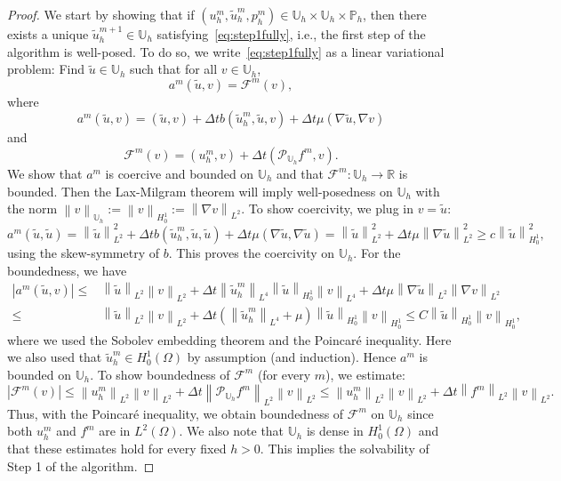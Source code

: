 \documentclass[10pt,letterpaper]{amsart}
\newcommand{\R}{\mathbb{R}}
\newcommand{\tu}{\widetilde{u}}
\newcommand\norm[1]{\left\lVert#1\right\rVert}
\newcommand{\Grad}{\nabla}
\newcommand{\dom}{\Omega}
\newcommand{\Ph}{\mathbb{P}_h}
\newcommand{\Uh}{\mathbb{U}_h}
\newcommand{\PUh}{\mathcal{P}_{\Uh}}
\theoremstyle{definition}{\newtheorem{definition}[lemma]{Definition}}
\numberwithin{equation}{section}
\begin{document}
\begin{proof}
	We start by showing that if $(u_h^m,\tu_h^m,p^m_h)\in\Uh\times\Uh\times\Ph$, then there exists a unique $\tu^{m+1}_h\in \Uh$ satisfying~\eqref{eq:step1fully}, i.e., the first step of the algorithm is well-posed. To do so, we write~\eqref{eq:step1fully} as a linear variational problem: Find $\tu\in \Uh $ such that for all $v\in \Uh $,
	\begin{equation}
	\label{eq:elliptic}
	a^m( \tu ,v)= \mathcal{F}^m(v),
	\end{equation}
	where 
	\begin{equation}
	\label{eq:defa}
	a^m(\tu,v) =  	\left(\tu,v\right)+ \Delta t b(\tu^m_h,\tu ,v)+\Delta t\mu(\Grad \tu ,\Grad v) 
	\end{equation}
and
	\begin{equation}
	\label{eq:deffn}
	\mathcal{F}^m(v) = (u^m_h,v)+\Delta t(\PUh f^{m},v).
		\end{equation}
We show that $a^m$ is coercive and bounded on $\Uh$ and that $\mathcal{F}^m:\Uh\to \R$ is bounded. Then the Lax-Milgram theorem will imply well-posedness on $\Uh$ with the norm $\norm{v}_{\Uh}:=\norm{v}_{H^1_0}:= \norm{\Grad v}_{L^2}$.	To show coercivity, we plug in $v=\tu$:
	\begin{equation*}
		a^m(\tu,\tu) =  	\norm{\tu}_{L^2}^2+ \Delta t b(\tu^m_h,\tu ,\tu)+\Delta t\mu(\Grad \tu ,\Grad \tu)
= \norm{\tu}_{L^2}^2+ \Delta t\mu\norm{\Grad \tu}_{L^2}^2
 \geq c\norm{\tu}_{H^1_0}^2,
	\end{equation*}
	using the skew-symmetry of $b$. 
 This proves the coercivity on $\Uh$. For the boundedness, we have
	\begin{align*}
	\left| 	a^m(\tu,v)\right| \leq  &  	\norm{\tu}_{L^2}\norm{v}_{L^2}+ \Delta t \norm{\tu^m_h}_{L^4}\norm{\tu}_{H^1_0}\norm{v}_{L^4}+\Delta t\mu\norm{\Grad \tu}_{L^2}\norm{\Grad v}_{L^2}\\
\leq & \norm{\tu}_{L^2}\norm{v}_{L^2}+ \Delta t( \norm{\tu^m_h}_{L^4}+\mu)\norm{\tu}_{H^1_0}\norm{v}_{H^1_0}\leq C \norm{\tu}_{H^1_0}\norm{v}_{H^1_0}, 
	\end{align*}
	where we used the Sobolev embedding theorem and the Poincar\'e inequality. Here we also used that $\tu^m_h\in H^1_0(\dom)$ by assumption (and induction).
	 Hence $a^m$ is bounded on $\Uh$. 
	To show boundedness of $\mathcal{F}^m$ (for every $m$), we estimate:
	\begin{equation*}
	|\mathcal{F}^m(v)|\leq \norm{u^m_h}_{L^2}\norm{v}_{L^2}+\Delta t \norm{\PUh f^{m}}_{L^2}\norm{v}_{L^2}\leq \norm{u^m_h}_{L^2}\norm{v}_{L^2}+ \Delta t\norm{  f^{m}}_{L^2}\norm{v}_{L^2}.
	\end{equation*}
	 Thus, with the Poincar\'e inequality, we obtain boundedness of $\mathcal{F}^m$ on $\Uh$ since both $u^m_h$ and $f^m$ are in $L^2(\dom)$.
	We also note that $\Uh$ is dense in $H^1_0(\dom)$ and that these estimates hold for every fixed $h>0$.
	This implies the solvability of Step 1 of the algorithm.
	

\end{proof}
\end{document}
